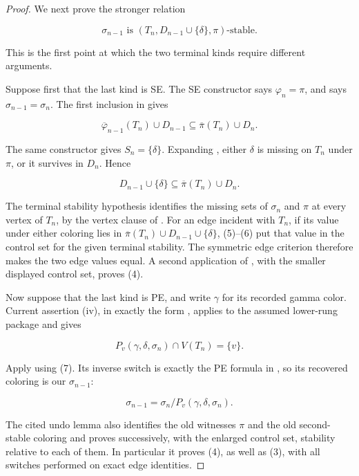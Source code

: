 \begin{proof}
We next prove the stronger relation

\[
 \sigma_{n-1}\text{ is }
 (T_n,D_{n-1}\cup\{\delta\},\pi)\text{-stable}.               \tag{4}
\]

This is the first point at which the two terminal kinds require different
arguments.

Suppose first that the last kind is SE.  The SE constructor says
\(\varphi_n=\pi\), and
 says
\(\sigma_{n-1}=\sigma_n\).  The first inclusion in
 gives

\[
 \overline\varphi_{n-1}(T_n)\cup D_{n-1}
 \subseteq \overline\pi(T_n)\cup D_n.                        \tag{5}
\]

The same constructor gives \(S_n=\{\delta\}\).  Expanding
, either \(\delta\) is missing on
\(T_n\) under \(\pi\), or it survives in \(D_n\).  Hence

\[
 D_{n-1}\cup\{\delta\}
 \subseteq\overline\pi(T_n)\cup D_n.                         \tag{6}
\]

The terminal stability hypothesis identifies the missing sets of
\(\sigma_n\) and \(\pi\) at every vertex of \(T_n\), by the vertex
clause of .  For an edge incident with \(T_n\),
if its value under either coloring lies in
\(\overline\pi(T_n)\cup D_{n-1}\cup\{\delta\}\), (5)--(6) put that
value in the control set for the given terminal stability.  The symmetric
edge criterion  therefore makes the two edge values equal.
A second application of , with the smaller displayed
control set, proves (4).

Now suppose that the last kind is PE, and write \(\gamma\) for its
recorded gamma color.  Current assertion (iv), in exactly the form
, applies to the assumed lower-rung package and
gives

\[
 P_v(\gamma,\delta,\sigma_n)\cap V(T_n)=\{v\}.               \tag{7}
\]

Apply  using (7).  Its inverse
switch is exactly the PE formula in
, so its recovered coloring is our
\(\sigma_{n-1}\):

\[
 \sigma_{n-1}=\sigma_n/P_v(\gamma,\delta,\sigma_n).           \tag{8}
\]

The cited undo lemma also identifies the old witnesses \(\pi\) and the
old second-stable coloring and proves successively, with the enlarged
control set, stability relative to each of them.  In particular it proves
(4), as well as (3), with all switches performed on exact edge identities.


\end{proof}
